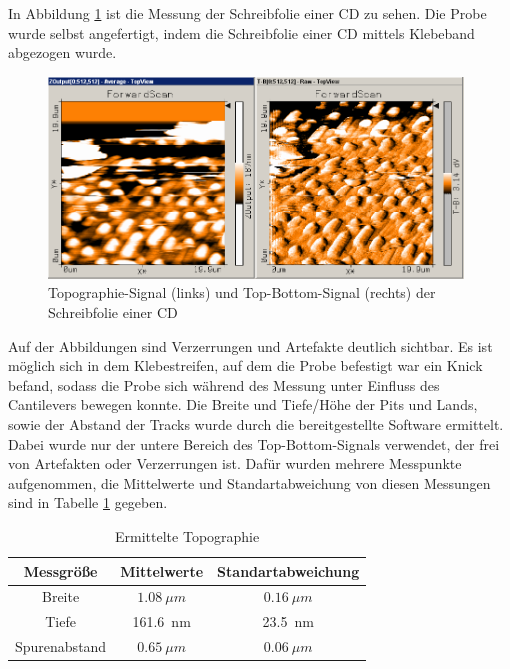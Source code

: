 In Abbildung \ref{fig:CD} ist die Messung der Schreibfolie einer CD zu sehen. Die Probe wurde selbst angefertigt, indem die Schreibfolie einer CD mittels Klebeband abgezogen wurde. 
\begin{figure}[]
    \centering
    \includegraphics[width=110mm,scale=0.5]{Rasterkraftmikroskop/Daten/A7.png}
    \caption{Topographie-Signal (links) und Top-Bottom-Signal (rechts) der Schreibfolie einer CD} 
    \label{fig:CD}
\end{figure}
Auf der Abbildungen sind Verzerrungen und Artefakte deutlich sichtbar. Es ist möglich sich in dem Klebestreifen, auf dem die Probe befestigt war ein Knick befand, sodass die Probe sich während des Messung unter Einfluss des Cantilevers bewegen konnte. 
Die Breite und Tiefe/Höhe der Pits und Lands, sowie der Abstand der Tracks wurde durch die bereitgestellte Software ermittelt. Dabei wurde nur der untere Bereich des Top-Bottom-Signals verwendet, der frei von Artefakten oder Verzerrungen ist. 
Dafür wurden mehrere Messpunkte aufgenommen, die Mittelwerte und Standartabweichung von diesen Messungen sind in Tabelle \ref{tab:CDTAB} gegeben. 

\begin{table}[]
    \centering
    \caption{Ermittelte Topographie}
    \begin{tabular}{ccc}
        Messgröße & Mittelwerte & Standartabweichung \\\hline
        Breite & $\SI{1,08}{\mu m}$& $\SI{0,16}{\mu m}$\\
        Tiefe & \SI{161.6}{nm}&\SI{23.5}{nm} \\
        Spurenabstand & $\SI{0,65}{\mu m}$& $\SI{0,06}{\mu m}$\\\hline
    \end{tabular}
    
    \label{tab:CDTAB}
\end{table}


